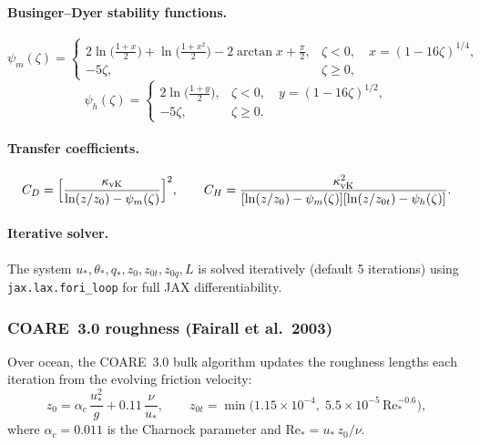 \documentclass[11pt,a4paper]{article}
\begin{document}
\paragraph{Businger--Dyer stability functions.}
\begin{equation}
  \psi_m(\zeta) = \begin{cases}
    2\ln\!\bigl(\frac{1+x}{2}\bigr)+\ln\!\bigl(\frac{1+x^2}{2}\bigr)-2\arctan x+\frac{\pi}{2}, & \zeta<0, \quad x=(1-16\zeta)^{1/4}, \\[4pt]
    -5\zeta, & \zeta\ge 0,
  \end{cases}
\end{equation}
\begin{equation}
  \psi_h(\zeta) = \begin{cases}
    2\ln\!\bigl(\frac{1+y}{2}\bigr), & \zeta<0, \quad y=(1-16\zeta)^{1/2}, \\[4pt]
    -5\zeta, & \zeta\ge 0.
  \end{cases}
\end{equation}

\paragraph{Transfer coefficients.}
\begin{equation}
  C_D = \Bigl[\frac{\kappa_{\mathrm{vK}}}{\ln(z/z_0)-\psi_m(\zeta)}\Bigr]^2, \qquad
  C_H = \frac{\kappa_{\mathrm{vK}}^2}{[\ln(z/z_0)-\psi_m(\zeta)][\ln(z/z_{0t})-\psi_h(\zeta)]}.
\end{equation}

\paragraph{Iterative solver.}
The system $u_*,\theta_*,q_*,z_0,z_{0t},z_{0q},L$ is solved iteratively (default 5 iterations) using \texttt{jax.lax.fori\_loop} for full JAX differentiability.

\subsubsection{COARE~3.0 roughness (Fairall et al.\ 2003)}

Over ocean, the COARE~3.0 bulk algorithm \citep{Fairall2003} updates the
roughness lengths each iteration from the evolving friction velocity:
\begin{equation}
  z_0 = \alpha_c\,\frac{u_*^2}{g}+0.11\,\frac{\nu}{u_*}, \qquad
  z_{0t} = \min\!\bigl(1.15\times10^{-4},\;5.5\times10^{-5}\,\mathrm{Re}_*^{-0.6}\bigr),
\end{equation}
where $\alpha_c=0.011$ is the Charnock parameter and $\mathrm{Re}_*=u_*\,z_0/\nu$.
\end{document}
